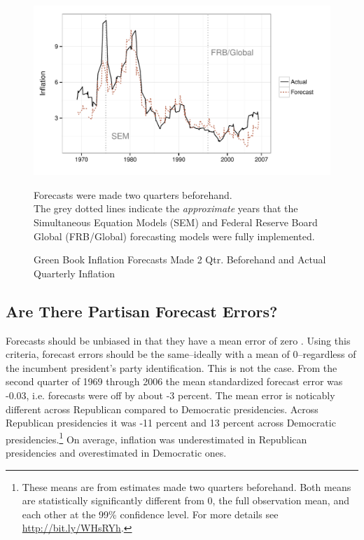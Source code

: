 \documentclass[a4paper]{article}\usepackage{graphicx, color}
\newenvironment{knitrout}{}{} %
\begin{document}
\begin{figure}[t]
    \caption{Green Book Inflation Forecasts Made 2 Qtr. Beforehand and Actual Quarterly Inflation}
    \label{absolute}
    \begin{center}
    
\begin{knitrout}
\color{fgcolor}

{\centering \includegraphics[width=0.8\linewidth]{figure/BaseInflation} 

}



\end{knitrout}

    
    \end{center}
    \begin{singlespace}
        {\scriptsize{Forecasts were made two quarters beforehand. \\
                     The grey dotted lines indicate the {\emph{approximate}} years that the Simultaneous Equation Models (SEM) and Federal Reserve Board Global (FRB/Global) forecasting models were fully implemented.  
                      }}
    \end{singlespace}
\end{figure}


\subsection{Are There Partisan Forecast Errors?}




Forecasts should be unbiased in that they have a mean error of zero \citep[5]{Bruck2006}. Using this criteria, forecast errors should be the same--ideally with a mean of 0--regardless of the incumbent president's party identification. This is not the case. From the second quarter of 1969 through 2006 the mean standardized forecast error was -0.03, i.e. forecasts were off by about -3 percent. The mean error is noticably different across Republican compared to Democratic presidencies. Across Republican presidencies it was -11 percent and 13 percent across Democratic presidencies.\footnote{These means are from estimates made two quarters beforehand. Both means are statistically significantly different from 0, the full observation mean, and each other at the 99\% confidence level. For more details see \url{http://bit.ly/WHsRYh}.} On average, inflation was underestimated in Republican presidencies and overestimated in Democratic ones.
\end{document}
